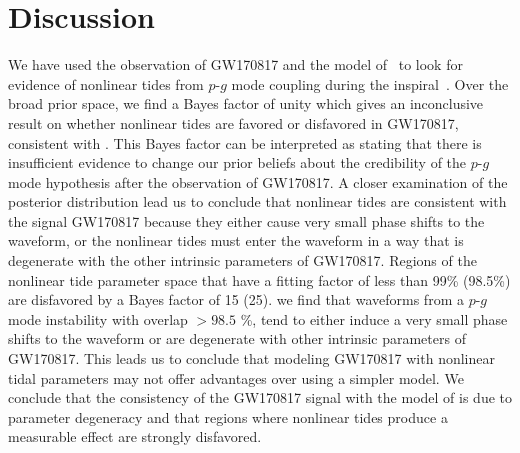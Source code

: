 \section{Discussion}
We have used the observation of GW170817 and the model of~\cite{Essick:2016tkn} to look for evidence of nonlinear tides from $p$-$g$ mode coupling during the inspiral~\citep{Weinberg:2013pbi,Weinberg:2015pxa,Zhou:2018tvc}. Over the broad prior space, we find a Bayes factor of unity which gives an inconclusive result on whether nonlinear tides are favored or disfavored in GW170817, consistent with \cite{abbott2019constraining}. This Bayes factor can be interpreted as stating that there is insufficient evidence to change our prior beliefs about the credibility of the $p$-$g$ mode hypothesis after the observation of GW170817. A closer examination of the posterior distribution lead us to conclude that nonlinear tides are consistent with the signal GW170817 because they either cause very small phase shifts to the waveform, or the nonlinear tides must enter the waveform in a way that is degenerate with the other intrinsic parameters of GW170817. Regions of the nonlinear tide parameter space that have a fitting factor of less than 99\% (98.5\%) are  disfavored by a Bayes factor of 15 (25). we find that waveforms from a $p$-$g$ mode instability with overlap $>98.5$ \%, tend to either induce a very small phase shifts to the waveform or are degenerate with other intrinsic parameters of GW170817. This leads us to conclude that modeling GW170817 with nonlinear tidal parameters may not offer advantages over using a simpler model. We conclude that the consistency of the GW170817 signal with the model of \cite{Essick:2016tkn} is due to parameter degeneracy and that regions where nonlinear tides produce a measurable effect are strongly disfavored.

